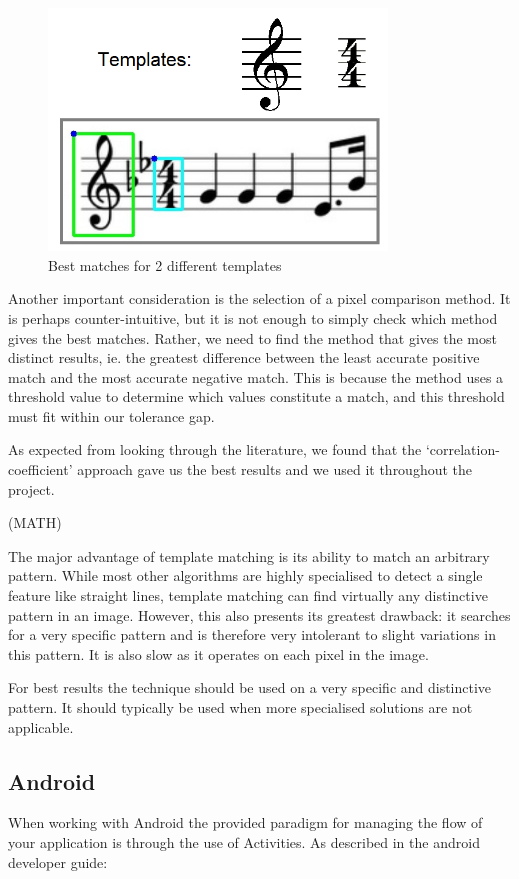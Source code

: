             \begin{figure}[h!]
                \centering
                \includegraphics[width=90mm]{./assets/templatematch.png}
                \caption{Best matches for 2 different templates}
                \label{image:templatematch}
            \end{figure}

Another important consideration is the selection of a pixel comparison method. It is perhaps counter-intuitive, but it is not enough to simply check which method gives the best matches. Rather, we need to find the method that gives the most distinct results, ie. the greatest difference between the least accurate positive match and the most accurate negative match. This is because the method uses a threshold value to determine
which values constitute a match, and this threshold must fit within our tolerance gap.

As expected from looking through the literature, we found that the ‘correlation-coefficient’ approach gave us the best results and we used it throughout the project.  

(MATH)

The major advantage of template matching is its ability to match an arbitrary pattern. While most other algorithms are highly specialised to detect a single feature like straight lines, template matching can find virtually any distinctive pattern in an image. However, this also presents its greatest drawback: it searches for a very specific pattern and is therefore very intolerant to slight variations in this pattern. It
is also slow as it operates on each pixel in the image.

For best results the technique should be used on a very specific and distinctive pattern. It should typically be used when more specialised solutions are not applicable.

    \subsection{Android}
When working with Android the provided paradigm for managing the flow of your application is through the use of Activities. As described in the android developer guide:

